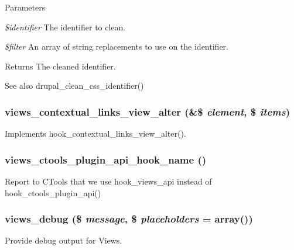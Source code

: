 \begin{DoxyParams}{Parameters}
\item[{\em \$identifier}]The identifier to clean. \item[{\em \$filter}]An array of string replacements to use on the identifier. \end{DoxyParams}
\begin{DoxyReturn}{Returns}
The cleaned identifier.
\end{DoxyReturn}
\begin{DoxySeeAlso}{See also}
drupal\_\-clean\_\-css\_\-identifier() 
\end{DoxySeeAlso}
\hypertarget{views_8module_ae9e5be1396c0f03114ade9e629d659ee}{
\subsubsection[{views\_\-contextual\_\-links\_\-view\_\-alter}]{\setlength{\rightskip}{0pt plus 5cm}views\_\-contextual\_\-links\_\-view\_\-alter (\&\$ {\em element}, \/  \$ {\em items})}}
\label{views_8module_ae9e5be1396c0f03114ade9e629d659ee}
Implements hook\_\-contextual\_\-links\_\-view\_\-alter(). \hypertarget{views_8module_abd5c327faf0b930512aaa7442a778504}{
\subsubsection[{views\_\-ctools\_\-plugin\_\-api\_\-hook\_\-name}]{\setlength{\rightskip}{0pt plus 5cm}views\_\-ctools\_\-plugin\_\-api\_\-hook\_\-name ()}}
\label{views_8module_abd5c327faf0b930512aaa7442a778504}
Report to CTools that we use hook\_\-views\_\-api instead of hook\_\-ctools\_\-plugin\_\-api() \hypertarget{views_8module_adb6971e0ec522398d8262cc90438e0f9}{
\subsubsection[{views\_\-debug}]{\setlength{\rightskip}{0pt plus 5cm}views\_\-debug (\$ {\em message}, \/  \$ {\em placeholders} = {\ttfamily array()})}}
\label{views_8module_adb6971e0ec522398d8262cc90438e0f9}
Provide debug output for Views.

